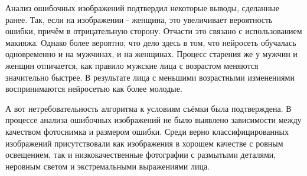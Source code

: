 Анализ ошибочных изображений подтвердил некоторые выводы, сделанные ранее. Так, если на изображении - женщина, это увеличивает вероятность ошибки, причём в отрицательную сторону. Отчасти это связано с использованием макияжа. Однако более вероятно, что дело здесь в том, что нейросеть обучалась одновременно и на мужчинах, и на женщинах. Процесс старения же у мужчин и женщин отличается, как правило мужские лица с возрастом меняются значительно быстрее. В результате лица с меньшими возрастными изменениями воспринимаются нейросетью как более молодые.

А вот нетребовательность алгоритма к условиям съёмки была подтверждена. В процессе анализа ошибочных изображений не было выявлено зависимости между качеством фотоснимка и размером ошибки. Среди верно классифицированных изображений присутствовали как изображения в хорошем качестве с ровным освещением, так и низкокачественные фотографии с размытыми деталями, неровным светом и экстремальными выражениями лица.
